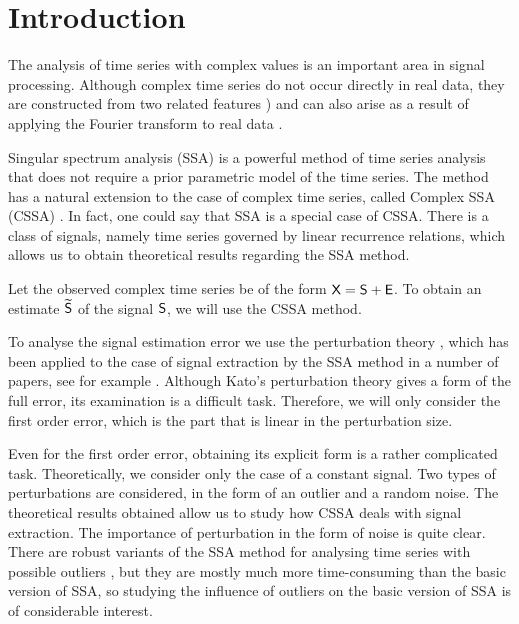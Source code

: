 \documentclass[engproc, submit, article,pdftex,moreauthors]{Definitions/mdpi}
\begin{document}
\section{Introduction}

The analysis of time series with complex values is an important area in signal processing. Although complex time series do not occur directly in real data, they are constructed from two related features \cite{Pang.etal19,Journe.etal2023}) and can also arise as a result of applying the Fourier transform to real data \cite{Trickett2008,YuanWang11}.

Singular spectrum analysis (SSA) \cite{Golyandina.etal2018} is a powerful method of time series analysis that does not require a prior parametric model of the time series. The method has a natural extension to the case of complex time series, called Complex SSA (CSSA) \cite{Kumaresan.Tufts1982,Keppenne.Lall1996}. In fact, one could say that SSA is a special case of CSSA.
There is a class of signals, namely time series governed by linear recurrence relations, which allows us to obtain theoretical results regarding the SSA method.

Let the observed complex time series be of the form $\textsf{X} =\textsf{S} + \textsf{E}$. To obtain an estimate $\widetilde{\textsf{S}}$ of the signal $\textsf{S}$, we will use the CSSA method.

To analyse the signal estimation error we use the perturbation theory \cite{Kato,Xu2002}, which has been applied to the case of signal extraction by the SSA method in a number of papers, see for example \cite{Nekrutkin, Hassani2011}.
Although Kato's perturbation theory gives a form of the full error, its examination is a difficult task. Therefore, we will only consider the first order error, which is the part that is linear in the perturbation size.

Even for the first order error, obtaining its explicit form is a rather complicated task. Theoretically, we consider only the case of a constant signal. Two types of perturbations are considered, in the form of an outlier and a random noise. The theoretical results obtained allow us to study how CSSA deals with signal extraction. The importance of perturbation in the form of noise is quite clear. There are robust variants of the SSA method for analysing time series with possible outliers \cite{Trickett.etal2012,Chen2015,Kalantari.etal2016,Bahia2019,Kazemi2023}, but they are mostly much more time-consuming than the basic version of SSA, so studying the influence of outliers on the basic version of SSA is of considerable interest.
\end{document}
